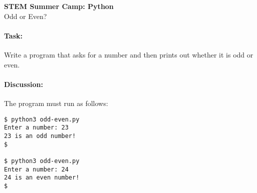 \documentclass[11pt]{article}
\begin{document}
    \begin{center}

        \large\textbf{STEM Summer Camp: Python} \\
        Odd or Even? \\

    \end{center}

    \paragraph{Task:} Write a program that asks for a number and then
    prints out whether it is odd or even.  
    
    \paragraph{Discussion:} The program must run as follows:
    
    \vspace{1.5em}

\begin{verbatim}
$ python3 odd-even.py
Enter a number: 23
23 is an odd number!
$

$ python3 odd-even.py
Enter a number: 24
24 is an even number!
$
\end{verbatim}
\end{document}
